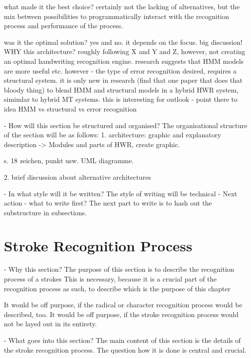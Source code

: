    what made it the best choice?
    certainly not the lacking of alternatives, but the mix between 
    possibilities to programmatically interact with the recognition process
    and performance of the process.

    was it the optimal solution?
    yes and no.
    it depends on the focus.
    big discussion! WHY this architecture?
    roughly following X and Y and Z,
    however, not creating an optimal handwriting recognition engine.
    research suggests that HMM models are more useful etc.
    however - the type of error recognition desired,
    requires a structural system.
    it is only new in research (find that one paper 
    that does that bloody thing) to blend HMM and structural models
    in a hybrid HWR system, simimlar to hybrid MT systems.
    this is interesting for outlook - point there to idea
    HMM vs structural vs error recognition

- How will this section be structured and organised?
  The organisational structure of the section will be as follows:
  1. architecture: graphic and explanatory description
  -> Modules and parts of HWR, create graphic.

  s. 18 zeichen, punkt usw. UML diagramme.
     
  2. brief discussion about alternative architectures

- In what style will it be written?
  The style of writing will be technical
- Next action - what to write first?
  The next part to write is to hash out the substructure in subsections.

\section{Stroke Recognition Process}
\label{sec:hwre:strokerecognitionprocess}

- Why this section? 
  The purpose of this section is to describe the recognition process of a strokes
  This is necessary, because it is a crucial part of the recognition process
  as such, to describe which is the purpose of this chapter

  It would be off purpose, if the radical or character recognition process 
  would be described, too.
  It would be off purpose, if the stroke recognition process would not be 
  layed out in its entirety.

- What goes into this section?
  The main content of this section is the details of the stroke recognition
  process. The question how it is done is central and crucial.

